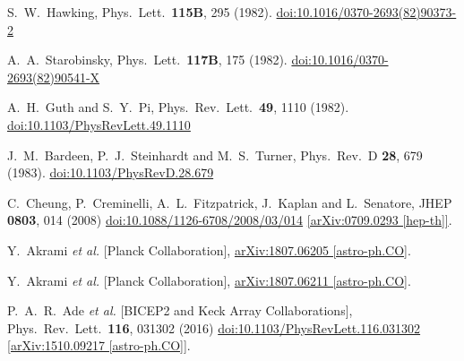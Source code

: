 \documentclass[11pt]{article}
\begin{document}
\begin{thebibliography}{99}
  S.~W.~Hawking,
  Phys.\ Lett.\  {\bf 115B}, 295 (1982).
  \href{https://dx.doi.org/10.1016/0370-2693(82)90373-2}{doi:10.1016/0370-2693(82)90373-2}

  A.~A.~Starobinsky,
  Phys.\ Lett.\  {\bf 117B}, 175 (1982).
  \href{https://dx.doi.org/10.1016/0370-2693(82)90541-X}{doi:10.1016/0370-2693(82)90541-X}

  A.~H.~Guth and S.~Y.~Pi,
  Phys.\ Rev.\ Lett.\  {\bf 49}, 1110 (1982).
  \href{https://dx.doi.org/10.1103/PhysRevLett.49.1110}{doi:10.1103/PhysRevLett.49.1110}

  J.~M.~Bardeen, P.~J.~Steinhardt and M.~S.~Turner,
  Phys.\ Rev.\ D {\bf 28}, 679 (1983).
  \href{https://dx.doi.org/10.1103/PhysRevD.28.679}{doi:10.1103/PhysRevD.28.679}

  C.~Cheung, P.~Creminelli, A.~L.~Fitzpatrick, J.~Kaplan and L.~Senatore,
  JHEP {\bf 0803}, 014 (2008)
  \href{https://dx.doi.org/10.1088/1126-6708/2008/03/014}{doi:10.1088/1126-6708/2008/03/014}
  \href{https://arxiv.org/abs/0709.0293}{[arXiv:0709.0293 [hep-th]]}.

  Y.~Akrami {\it et al.} [Planck Collaboration],
  \href{https://arxiv.org/abs/1807.06205}{arXiv:1807.06205 [astro-ph.CO]}.

  Y.~Akrami {\it et al.} [Planck Collaboration],
  \href{https://arxiv.org/abs/1807.06211}{arXiv:1807.06211 [astro-ph.CO]}.

  P.~A.~R.~Ade {\it et al.} [BICEP2 and Keck Array Collaborations],
  Phys.\ Rev.\ Lett.\  {\bf 116}, 031302 (2016)
  \href{https://dx.doi.org/10.1103/PhysRevLett.116.031302}{doi:10.1103/PhysRevLett.116.031302}
  \href{https://arxiv.org/abs/1510.09217}{[arXiv:1510.09217 [astro-ph.CO]]}.


\end{thebibliography}
\end{document}
